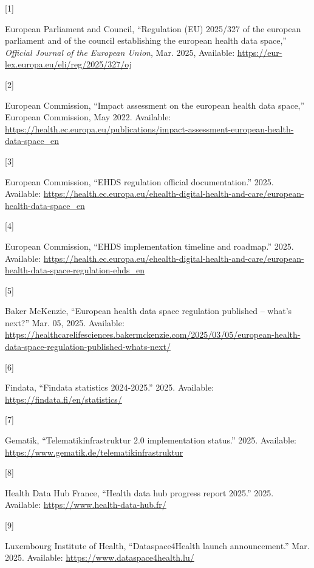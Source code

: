 \documentclass[
  a4paper,
  a4paper,
  11pt]{ltjsbook}
\newlength{\cslhangindent}
\newlength{\csllabelwidth}
\newenvironment{CSLReferences}[2] %
 {\begin{list}{}{%
  \setlength{\itemindent}{0pt}
  \setlength{\leftmargin}{0pt}
  \setlength{\parsep}{0pt}
  \ifodd #1
   \setlength{\leftmargin}{\cslhangindent}
   \setlength{\itemindent}{-1\cslhangindent}
  \fi
  \setlength{\itemsep}{#2\baselineskip}}}
 {\end{list}}
\newcommand{\CSLLeftMargin}[1]{\parbox[t]{\csllabelwidth}{\strut#1\strut}}
\newcommand{\CSLRightInline}[1]{\parbox[t]{\linewidth - \csllabelwidth}{\strut#1\strut}}
\begin{document}
\label{refs}
\begin{CSLReferences}{0}{0}
\CSLLeftMargin{{[}1{]} }%
\CSLRightInline{European Parliament and Council, {``Regulation (EU)
2025/327 of the european parliament and of the council establishing the
european health data space,''} \emph{Official Journal of the European
Union}, Mar. 2025, Available:
\url{https://eur-lex.europa.eu/eli/reg/2025/327/oj}}

\CSLLeftMargin{{[}2{]} }%
\CSLRightInline{European Commission, {``Impact assessment on the
european health data space,''} European Commission, May 2022. Available:
\url{https://health.ec.europa.eu/publications/impact-assessment-european-health-data-space_en}}

\CSLLeftMargin{{[}3{]} }%
\CSLRightInline{European Commission, {``EHDS regulation official
documentation.''} 2025. Available:
\url{https://health.ec.europa.eu/ehealth-digital-health-and-care/european-health-data-space_en}}

\CSLLeftMargin{{[}4{]} }%
\CSLRightInline{European Commission, {``EHDS implementation timeline and
roadmap.''} 2025. Available:
\url{https://health.ec.europa.eu/ehealth-digital-health-and-care/european-health-data-space-regulation-ehds_en}}

\CSLLeftMargin{{[}5{]} }%
\CSLRightInline{Baker McKenzie, {``European health data space regulation
published -- what's next?''} Mar. 05, 2025. Available:
\url{https://healthcarelifesciences.bakermckenzie.com/2025/03/05/european-health-data-space-regulation-published-whats-next/}}

\CSLLeftMargin{{[}6{]} }%
\CSLRightInline{Findata, {``Findata statistics 2024-2025.''} 2025.
Available: \url{https://findata.fi/en/statistics/}}

\CSLLeftMargin{{[}7{]} }%
\CSLRightInline{Gematik, {``Telematikinfrastruktur 2.0 implementation
status.''} 2025. Available:
\url{https://www.gematik.de/telematikinfrastruktur}}

\CSLLeftMargin{{[}8{]} }%
\CSLRightInline{Health Data Hub France, {``Health data hub progress
report 2025.''} 2025. Available: \url{https://www.health-data-hub.fr/}}

\CSLLeftMargin{{[}9{]} }%
\CSLRightInline{Luxembourg Institute of Health, {``Dataspace4Health
launch announcement.''} Mar. 2025. Available:
\url{https://www.dataspace4health.lu/}}


\end{CSLReferences}
\end{document}
